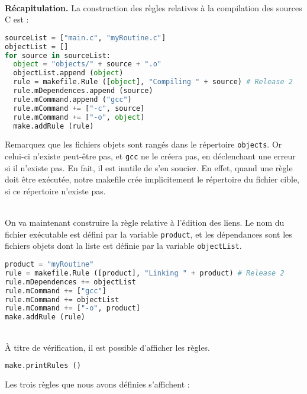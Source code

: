 \documentclass[a4paper,11pt]{extarticle}
\begin{document}
~\\{\bf Récapitulation.} La construction des règles relatives à la compilation des sources C est :
\begin{lstlisting}[language=py]
sourceList = ["main.c", "myRoutine.c"]
objectList = []
for source in sourceList:
  object = "objects/" + source + ".o"
  objectList.append (object)
  rule = makefile.Rule ([object], "Compiling " + source) # Release 2
  rule.mDependences.append (source)
  rule.mCommand.append ("gcc")
  rule.mCommand += ["-c", source]
  rule.mCommand += ["-o", object]
  make.addRule (rule)
\end{lstlisting}
Remarquez que les fichiers objets sont rangés dans le répertoire \texttt{objects}. Or celui-ci n'existe peut-être pas, et \texttt{gcc} ne le créera pas, en déclenchant une erreur si il n'existe pas. En fait, il est inutile de s'en soucier. En effet, quand une règle doit être exécutée, notre makefile crée implicitement le répertoire du fichier cible, si ce répertoire n'existe pas.

~\\On va maintenant construire la règle relative à l'édition des liens. Le nom du fichier exécutable est défini par la variable \texttt{product}, et les dépendances sont les fichiers objets dont la liste est définie par la variable \texttt{objectList}.
\begin{lstlisting}[language=py]
product = "myRoutine"
rule = makefile.Rule ([product], "Linking " + product) # Release 2
rule.mDependences += objectList
rule.mCommand += ["gcc"]
rule.mCommand += objectList
rule.mCommand += ["-o", product]
make.addRule (rule)
\end{lstlisting}

~\\À titre de vérification, il est possible d'afficher les règles.
\begin{lstlisting}[language=py]
make.printRules ()
\end{lstlisting}

Les trois règles que nous avons définies s'affichent :
\end{document}
